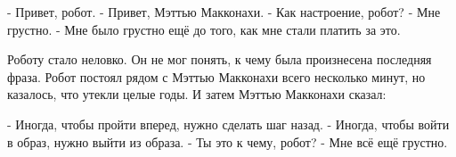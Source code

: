 - Привет, робот.
- Привет, Мэттью Макконахи.
- Как настроение, робот?
- Мне грустно.
- Мне было грустно ещё до того, как мне стали платить за это.

Роботу стало неловко. Он не мог понять, к чему была произнесена последняя фраза. Робот постоял рядом с Мэттью Макконахи всего несколько минут, но казалось, что утекли целые годы. И затем Мэттью Макконахи сказал:

- Иногда, чтобы пройти вперед, нужно сделать шаг назад.
- Иногда, чтобы войти в образ, нужно выйти из образа.
- Ты это к чему, робот?
- Мне всё ещё грустно.